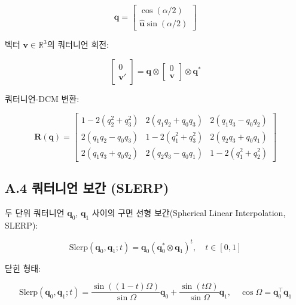 \begin{equation}
    \mathbf{q} = \begin{bmatrix} \cos(\alpha/2) \\ \hat{\mathbf{u}}\sin(\alpha/2) \end{bmatrix}
    \tag{A.9}
\end{equation}
 
벡터 $\mathbf{v} \in \mathbb{R}^3$의 쿼터니언 회전:
 
\begin{equation}
    \begin{bmatrix} 0 \\ \mathbf{v}' \end{bmatrix} =
    \mathbf{q} \otimes \begin{bmatrix} 0 \\ \mathbf{v} \end{bmatrix} \otimes \mathbf{q}^*
    \tag{A.10}
\end{equation}
 
쿼터니언-DCM 변환:
 
\begin{equation}
    \mathbf{R}(\mathbf{q}) =
    \begin{bmatrix}
        1-2(q_2^2+q_3^2) & 2(q_1q_2+q_0q_3) & 2(q_1q_3-q_0q_2) \\
        2(q_1q_2-q_0q_3) & 1-2(q_1^2+q_3^2) & 2(q_2q_3+q_0q_1) \\
        2(q_1q_3+q_0q_2) & 2(q_2q_3-q_0q_1) & 1-2(q_1^2+q_2^2)
    \end{bmatrix}
    \tag{A.11}
\end{equation}
 
\subsection*{A.4 쿼터니언 보간 (SLERP)}
 
두 단위 쿼터니언 $\mathbf{q}_0$, $\mathbf{q}_1$ 사이의
구면 선형 보간(Spherical Linear Interpolation, SLERP):
 
\begin{equation}
    \text{Slerp}(\mathbf{q}_0, \mathbf{q}_1; t) =
    \mathbf{q}_0 \left(\mathbf{q}_0^* \otimes \mathbf{q}_1\right)^t, \quad t \in [0, 1]
    \tag{A.12}
\end{equation}
 
닫힌 형태:
 
\begin{equation}
    \text{Slerp}(\mathbf{q}_0, \mathbf{q}_1; t) =
    \frac{\sin((1-t)\Omega)}{\sin\Omega}\mathbf{q}_0 +
    \frac{\sin(t\Omega)}{\sin\Omega}\mathbf{q}_1, \quad
    \cos\Omega = \mathbf{q}_0^\top \mathbf{q}_1
    \tag{A.13}
\end{equation}
 
